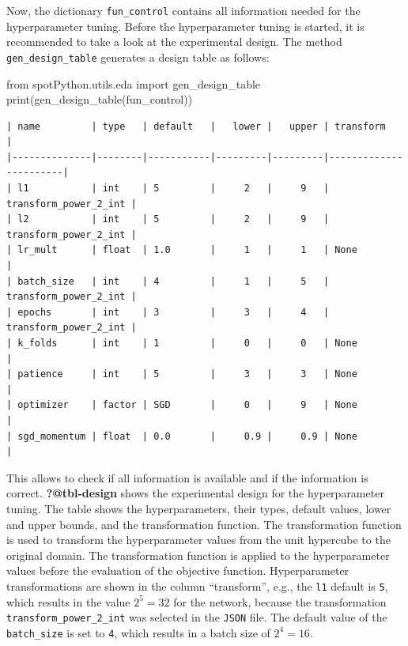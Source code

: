 \documentclass[
  letterpaper,
  DIV=11,
  numbers=noendperiod]{scrreprt}
\newenvironment{Shaded}{\begin{snugshade}}{\end{snugshade}}
\newcommand{\BuiltInTok}[1]{\textcolor[rgb]{0.00,0.23,0.31}{#1}}
\newcommand{\ImportTok}[1]{\textcolor[rgb]{0.00,0.46,0.62}{#1}}
\newcommand{\NormalTok}[1]{\textcolor[rgb]{0.00,0.23,0.31}{#1}}
\begin{document}
Now, the dictionary \texttt{fun\_control} contains all information
needed for the hyperparameter tuning. Before the hyperparameter tuning
is started, it is recommended to take a look at the experimental design.
The method \texttt{gen\_design\_table} generates a design table as
follows:

\begin{Shaded}
\begin{Highlighting}[]
\ImportTok{from}\NormalTok{ spotPython.utils.eda }\ImportTok{import}\NormalTok{ gen\_design\_table}
\BuiltInTok{print}\NormalTok{(gen\_design\_table(fun\_control))}
\end{Highlighting}
\end{Shaded}

\begin{verbatim}
| name         | type   | default   |   lower |   upper | transform             |
|--------------|--------|-----------|---------|---------|-----------------------|
| l1           | int    | 5         |     2   |     9   | transform_power_2_int |
| l2           | int    | 5         |     2   |     9   | transform_power_2_int |
| lr_mult      | float  | 1.0       |     1   |     1   | None                  |
| batch_size   | int    | 4         |     1   |     5   | transform_power_2_int |
| epochs       | int    | 3         |     3   |     4   | transform_power_2_int |
| k_folds      | int    | 1         |     0   |     0   | None                  |
| patience     | int    | 5         |     3   |     3   | None                  |
| optimizer    | factor | SGD       |     0   |     9   | None                  |
| sgd_momentum | float  | 0.0       |     0.9 |     0.9 | None                  |
\end{verbatim}

This allows to check if all information is available and if the
information is correct. \textbf{?@tbl-design} shows the experimental
design for the hyperparameter tuning. The table shows the
hyperparameters, their types, default values, lower and upper bounds,
and the transformation function. The transformation function is used to
transform the hyperparameter values from the unit hypercube to the
original domain. The transformation function is applied to the
hyperparameter values before the evaluation of the objective function.
Hyperparameter transformations are shown in the column ``transform'',
e.g., the \texttt{l1} default is \texttt{5}, which results in the value
\(2^5 = 32\) for the network, because the transformation
\texttt{transform\_power\_2\_int} was selected in the \texttt{JSON}
file. The default value of the \texttt{batch\_size} is set to
\texttt{4}, which results in a batch size of \(2^4 = 16\).
\end{document}
